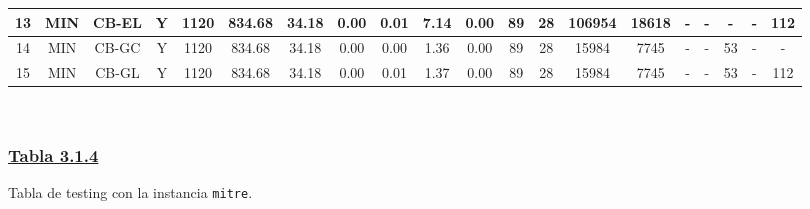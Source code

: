 {\begin{tabular}{ *{19}{c|} c }
\hline
13 & MIN & CB-EL & Y & 1120 & 834.68 & 34.18 & 0.00 & 0.01 & 7.14 & 0.00 & 89 & 28 & 106954 & 18618 & - & - & - & - & 112\\
\hline
14 & MIN & CB-GC & Y & 1120 & 834.68 & 34.18 & 0.00 & 0.00 & 1.36 & 0.00 & 89 & 28 & 15984 & 7745 & - & - & 53 & - & -\\
\hline
15 & MIN & CB-GL & Y & 1120 & 834.68 & 34.18 & 0.00 & 0.01 & 1.37 & 0.00 & 89 & 28 & 15984 & 7745 & - & - & 53 & - & 112\\
\hline
\end{tabular}\\
\vspace{4mm}
}

\newpage

\subsubsection*{\underline{Tabla 3.1.4}}
\noindent Tabla de testing con la instancia \verb_mitre_.\\

